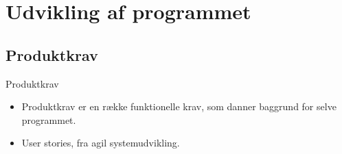 \section{Udvikling af programmet}


\subsection{Produktkrav}
\begin{frame}{Produktkrav}

\begin{itemize}
	\item Produktkrav er en række funktionelle krav, som danner baggrund for selve programmet.
	\item User stories, fra agil systemudvikling.
\end{itemize}
\end{frame}

